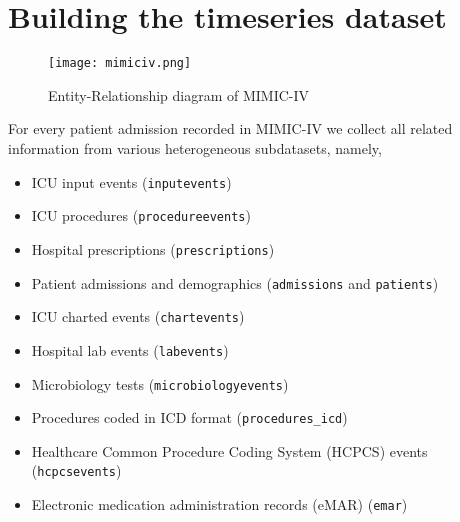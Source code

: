 
\section{Building the timeseries dataset}

\begin{figure}
    \centering
    \texttt{[image: mimiciv.png]}
    \caption{Entity-Relationship diagram of MIMIC-IV}
    \label{fig:mimic}
\end{figure}

For every patient admission recorded in MIMIC-IV we collect all related information from various heterogeneous subdatasets, namely,

\begin{itemize}
    \item ICU input events (\texttt{inputevents})
    \item ICU procedures (\texttt{procedureevents})
    \item Hospital prescriptions (\texttt{prescriptions})
    \item Patient admissions and demographics (\texttt{admissions} and \texttt{patients})
    \item ICU charted events (\texttt{chartevents})
    \item Hospital lab events (\texttt{labevents})
    \item Microbiology tests (\texttt{microbiologyevents})
    \item Procedures coded in ICD format (\texttt{procedures\_icd})
    \item Healthcare Common Procedure Coding System (HCPCS) events (\texttt{hcpcsevents})
    \item Electronic medication administration records (eMAR) (\texttt{emar})
\end{itemize}


